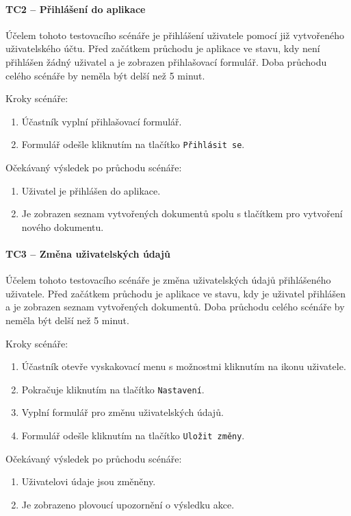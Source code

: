 \paragraph{TC2 -- Přihlášení do aplikace}

Účelem tohoto testovacího scénáře je přihlášení uživatele pomocí již vytvořeného uživatelského účtu.
Před začátkem průchodu je aplikace ve stavu, kdy není přihlášen žádný uživatel a je zobrazen přihlašovací formulář.
Doba průchodu celého scénáře by neměla být delší než 5 minut.

Kroky scénáře:
\begin{enumerate}
    \item Účastník vyplní přihlašovací formulář.
    \item Formulář odešle kliknutím na tlačítko \texttt{Přihlásit se}.
\end{enumerate}

Očekávaný výsledek po průchodu scénáře:
\begin{enumerate}
    \item Uživatel je přihlášen do aplikace.
    \item Je zobrazen seznam vytvořených dokumentů spolu s tlačítkem pro vytvoření nového dokumentu.
\end{enumerate}

\paragraph{TC3 -- Změna uživatelských údajů}

Účelem tohoto testovacího scénáře je změna uživatelských údajů přihlášeného uživatele.
Před začátkem průchodu je aplikace ve stavu, kdy je uživatel přihlášen a je zobrazen seznam vytvořených dokumentů.
Doba průchodu celého scénáře by neměla být delší než 5 minut.

Kroky scénáře:
\begin{enumerate}
    \item Účastník otevře vyskakovací menu s možnostmi kliknutím na ikonu uživatele.
    \item Pokračuje kliknutím na tlačítko \texttt{Nastavení}.
    \item Vyplní formulář pro změnu uživatelských údajů.
    \item Formulář odešle kliknutím na tlačítko \texttt{Uložit změny}.
\end{enumerate}

Očekávaný výsledek po průchodu scénáře:
\begin{enumerate}
    \item Uživatelovi údaje jsou změněny.
    \item Je zobrazeno plovoucí upozornění o výsledku akce.
\end{enumerate}

